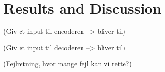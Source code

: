 \documentclass[Main]{subfiles}
\begin{document}
\section{Results and Discussion}

(Giv et input til encoderen --> bliver til)

(Giv et input til decoderen --> bliver til)

(Fejlretning, hvor mange fejl kan vi rette?)
\end{document}
